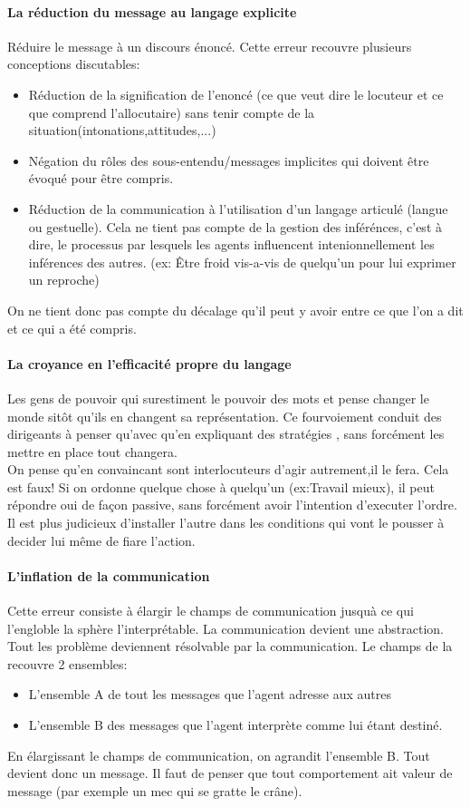\documentclass[11pt]{article} %
\begin{document}
		\paragraph{La réduction du message au langage explicite}  Réduire le message à un discours 
		énoncé. Cette erreur recouvre plusieurs conceptions discutables:
		\begin{itemize}
			\item Réduction de la signification de l'enoncé (ce que veut dire le locuteur et ce que comprend 
			l'allocutaire) sans tenir compte de la situation(intonations,attitudes,...)
			\item Négation du rôles des sous-entendu/messages implicites qui doivent être évoqué pour
		être compris.
			\item Réduction de la communication à l'utilisation d'un langage articulé (langue ou gestuelle). 
			Cela ne tient pas compte de la gestion des inférénces, c'est à dire, le processus par lesquels
			les agents influencent intenionnellement les inférences des autres. (ex: Être froid vis-a-vis de 
			quelqu'un pour lui exprimer un reproche) 
		\end{itemize} 
		On ne tient donc pas compte du décalage qu'il peut y avoir entre ce que l'on a dit et ce qui a été 
		compris.
		\paragraph{La croyance en l'efficacité propre du langage} Les gens de pouvoir qui surestiment le 
		pouvoir des mots et pense changer le monde sitôt qu'ils en changent sa représentation. Ce 
		fourvoiement conduit des dirigeants à penser qu'avec qu'en expliquant des stratégies , sans forcément 
		les mettre en place tout changera.\\
		On pense qu'en convaincant sont interlocuteurs d'agir autrement,il le fera. Cela est faux! Si on ordonne
		quelque chose à quelqu'un (ex:Travail mieux), il peut répondre oui de façon passive, sans forcément 
		avoir l'intention d'executer l'ordre. Il est plus judicieux d'installer l'autre dans les conditions qui vont le 
		pousser à decider lui même de fiare l'action. 
		\paragraph{L'inflation de la communication} Cette erreur consiste à élargir le champs de 
		communication jusquà ce qui l'engloble la sphère l'interprétable. La communication devient une 
		abstraction. Tout les problème deviennent résolvable par la communication.  Le champs de la recouvre 
		2 ensembles:
		\begin{itemize}
			\item L'ensemble A de tout les messages que l'agent adresse aux autres
			\item L'ensemble B des messages que l'agent interprète comme lui étant destiné. 
		\end{itemize}
		En élargissant le champs de communication, on agrandit l'ensemble B. Tout devient donc un message.
		 Il faut de penser que tout comportement ait valeur de message (par exemple un mec qui se gratte le 
		 crâne).
\end{document}
